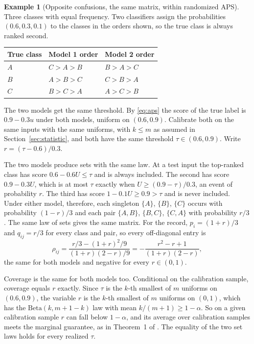 \documentclass[11pt]{article}
\theoremstyle{definition}
\newtheorem{example}{Example}
\theoremstyle{definition}
\theoremstyle{remark}
\newcommand{\set}[1]{\{#1\}}
\begin{document}
\begin{example}[Opposite confusions, the same matrix, within randomized APS]\label{ex:aps}
Three classes with equal frequency. Two classifiers assign the probabilities $(0.6, 0.3, 0.1)$ to
the classes in the orders shown, so the true class is always ranked second.

\begin{center}
\begin{tabular}{lll}
\toprule
True class & Model 1 order & Model 2 order \\
\midrule
$A$ & $C > A > B$ & $B > A > C$ \\
$B$ & $A > B > C$ & $C > B > A$ \\
$C$ & $B > C > A$ & $A > C > B$ \\
\bottomrule
\end{tabular}
\end{center}

The two models get the same threshold. By \eqref{eq:aps} the score of the true label is
$0.9 - 0.3u$ under both models, uniform on $(0.6, 0.9)$. Calibrate both on the same inputs with the same uniforms, with $k \le m$ as assumed in
Section~\ref{sec:statistic}, and both have the same threshold $\tau \in (0.6, 0.9)$. Write
$r = (\tau - 0.6)/0.3$.

The two models produce sets with the same law. At a test input the top-ranked class has score
$0.6 - 0.6U \le \tau$ and is always included. The second has score $0.9 - 0.3U$, which is at most
$\tau$ exactly when $U \ge (0.9 - \tau)/0.3$, an event of probability $r$. The third has score $1 - 0.1U \ge 0.9 > \tau$ and is never included. Under either model, therefore, each singleton
$\set{A}$, $\set{B}$, $\set{C}$ occurs with probability $(1-r)/3$ and each pair $\set{A, B}$,
$\set{B, C}$, $\set{C, A}$ with probability $r/3$. The same law of sets gives the same matrix. For
the record, $p_i = (1+r)/3$ and $q_{ij} = r/3$ for every class and pair, so every off-diagonal
entry is
\[
\rho_{ij} = \frac{r/3 - (1+r)^2/9}{(1+r)(2-r)/9} = -\frac{r^2 - r + 1}{(1+r)(2-r)},
\]
the same for both models and negative for every $r \in (0, 1)$.

Coverage is the same for both models too. Conditional on the calibration sample, coverage equals
$r$ exactly. Since $\tau$ is the $k$-th smallest of $m$ uniforms
on $(0.6, 0.9)$, the variable $r$ is the $k$-th smallest of $m$ uniforms on $(0, 1)$, which has the
$\mathrm{Beta}(k, m+1-k)$ law with mean $k/(m+1) \ge 1 - \alpha$. So on a given calibration sample
$r$ can fall below $1 - \alpha$, and its average over calibration samples meets the marginal
guarantee, as in Theorem~1 of \citet{romano2020}. The equality of the two set laws holds for every
realized $\tau$.


\end{example}
\end{document}
